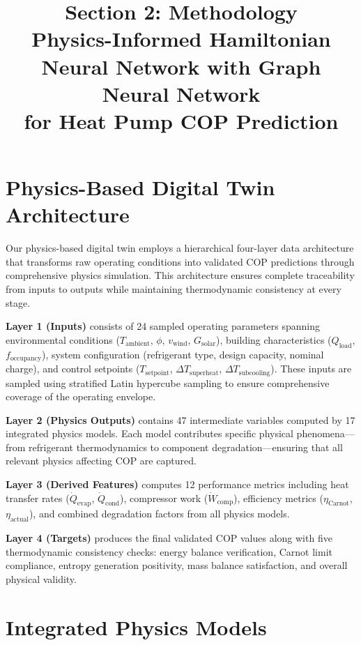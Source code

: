 \documentclass[11pt]{article}
\title{\textbf{Section 2: Methodology}\\[0.5em]
\large Physics-Informed Hamiltonian Neural Network with Graph Neural Network\\
for Heat Pump COP Prediction}
\author{}
\date{}
\begin{document}
\maketitle

\section{Physics-Based Digital Twin Architecture}

Our physics-based digital twin employs a hierarchical four-layer data architecture that transforms raw operating conditions into validated COP predictions through comprehensive physics simulation. This architecture ensures complete traceability from inputs to outputs while maintaining thermodynamic consistency at every stage.

\textbf{Layer 1 (Inputs)} consists of 24 sampled operating parameters spanning environmental conditions ($T_{\text{ambient}}$, $\phi$, $v_{\text{wind}}$, $G_{\text{solar}}$), building characteristics ($Q_{\text{load}}$, $f_{\text{occupancy}}$), system configuration (refrigerant type, design capacity, nominal charge), and control setpoints ($T_{\text{setpoint}}$, $\Delta T_{\text{superheat}}$, $\Delta T_{\text{subcooling}}$). These inputs are sampled using stratified Latin hypercube sampling to ensure comprehensive coverage of the operating envelope.

\textbf{Layer 2 (Physics Outputs)} contains 47 intermediate variables computed by 17 integrated physics models. Each model contributes specific physical phenomena---from refrigerant thermodynamics to component degradation---ensuring that all relevant physics affecting COP are captured.

\textbf{Layer 3 (Derived Features)} computes 12 performance metrics including heat transfer rates ($\dot{Q}_{\text{evap}}$, $\dot{Q}_{\text{cond}}$), compressor work ($\dot{W}_{\text{comp}}$), efficiency metrics ($\eta_{\text{Carnot}}$, $\eta_{\text{actual}}$), and combined degradation factors from all physics models.

\textbf{Layer 4 (Targets)} produces the final validated COP values along with five thermodynamic consistency checks: energy balance verification, Carnot limit compliance, entropy generation positivity, mass balance satisfaction, and overall physical validity.

\section{Integrated Physics Models}
\end{document}
